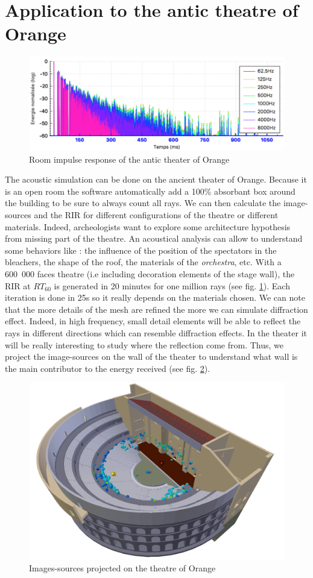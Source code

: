 \documentclass[AMA,STIX1COL]{WileyNJD-v2}
\begin{document}
\section{Application to the antic theatre of Orange}\label{sec7}

\begin{figure}[h]
\centering
	\includegraphics[width=0.7\linewidth]{rir}
	\caption{Room impulse response of the antic theater of Orange}
	\label{rir}
\end{figure}

The acoustic simulation can be done on the ancient theater of Orange. Because it is an open room the software automatically add a 100\% absorbant box around the building to be sure to always count all rays. We can then calculate the image-sources and the RIR for different configurations of the theatre or different materials. Indeed, archeologists want to explore some architecture hypothesis from missing part of the theatre. An acoustical analysis can allow to understand some behaviors like : the influence of the position of the spectators in the bleachers, the shape of the roof, the materials of the \textit{orchestra}, etc. With a 600~000 faces theatre (i.e including decoration elements of the stage wall), the RIR at $RT_{60}$ is generated in 20 minutes for one million rays (see fig. \ref{rir}). Each iteration is done in 25s so it really depends on the materials chosen. We can note that the more details of the mesh are refined the more we can simulate diffraction effect. Indeed, in high frequency, small detail elements will be able to reflect the rays in different directions which can resemble diffraction effects. In the theater it will be really interesting to study where the reflection come from. Thus, we project the image-sources on the wall of the theater to understand what wall is the main contributor to the energy received (see fig. \ref{theatre}).

\begin{figure}[h]
\centering
	\includegraphics[width=0.7\linewidth]{theatre}
	\caption{Images-sources projected on the theatre of Orange}
	\label{theatre}
\end{figure}
\end{document}
